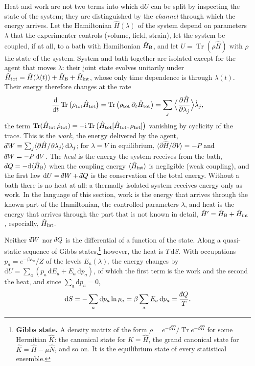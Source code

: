 \documentclass[10pt,a4paper]{article}
\newcommand{\dd}{\mathrm{d}}
\newcommand{\ii}{\mathrm{i}}
\newcommand{\Tr}{\operatorname{Tr}}
\newcommand{\dbar}{\mathchar'26\mkern-11mu d}
\begin{document}
Heat and work are not two terms into which $ \dd U $ can be split by inspecting the state of the system; they are distinguished by the \emph{channel} through which the energy arrives.
Let the Hamiltonian $ \hat H(\lambda) $ of the system depend on parameters $ \lambda $ that the experimenter controls (volume, field, strain), let the system be coupled, if at all, to a bath with Hamiltonian $ \hat H_{\rm B} $, and let $ U = \Tr(\rho\hat H) $ with $ \rho $ the state of the system.
System and bath together are isolated except for the agent that moves $ \lambda $: their joint state evolves unitarily under $ \hat H_{\rm tot} = \hat H(\lambda(t)) + \hat H_{\rm B} + \hat H_{\rm int} $, whose only time dependence is through $ \lambda(t) $.
Their energy therefore changes at the rate
\[
  \frac{\dd}{\dd t}\Tr\big(\rho_{\rm tot}\hat H_{\rm tot}\big)
  = \Tr\big(\rho_{\rm tot}\,\partial_t\hat H_{\rm tot}\big)
  = \sum_j\Big\langle\frac{\partial\hat H}{\partial\lambda_j}\Big\rangle\dot\lambda_j ,
\]
the term $ \Tr(\hat H_{\rm tot}\,\dot\rho_{\rm tot}) = -\ii\Tr\big(\hat H_{\rm tot}[\hat H_{\rm tot}, \rho_{\rm tot}]\big) $ vanishing by cyclicity of the trace.
This is the \emph{work}, the energy delivered by the agent, $ \dbar W = \sum_j\langle\partial\hat H/\partial\lambda_j\rangle\,\dd\lambda_j $; for $ \lambda = V $ in equilibrium, $ \langle\partial\hat H/\partial V\rangle = -P $ and $ \dbar W = -P\,\dd V $.
The \emph{heat} is the energy the system receives from the bath, $ \dbar Q = -\dd\langle\hat H_{\rm B}\rangle $ when the coupling energy $ \langle\hat H_{\rm int}\rangle $ is negligible (weak coupling), and the first law $ \dd U = \dbar W + \dbar Q $ is the conservation of the total energy.
Without a bath there is no heat at all: a thermally isolated system receives energy only as work.
In the language of this section, work is the energy that arrives through the known part of the Hamiltonian, the controlled parameters $ \lambda $, and heat is the energy that arrives through the part that is not known in detail, $ \hat H' = \hat H_{\rm B} + \hat H_{\rm int} $, especially, $ \hat H_{\rm int} $.

Neither $ \dbar W $ nor $ \dbar Q $ is the differential of a function of the state.
Along a quasi-static sequence of Gibbs states,\footnote{\label{fn:gibbsstate}\textbf{Gibbs state.}
A density matrix of the form $ \rho = e^{-\beta\hat K}/\Tr e^{-\beta\hat K} $ for some Hermitian $ \hat K $: the canonical state for $ \hat K = \hat H $, the grand canonical state for $ \hat K = \hat H - \mu\hat N $, and so on.
It is the equilibrium state of every statistical ensemble.} however, the heat is $ T\,\dd S $.
With occupations $ p_a = e^{-\beta E_a}/Z $ of the levels $ E_a(\lambda) $, the energy changes by $ \dd U = \sum_a(p_a\,\dd E_a + E_a\,\dd p_a) $, of which the first term is the work and the second the heat, and since $ \sum_a \dd p_a = 0 $,
\[
  \dd S = -\sum_a \dd p_a\ln p_a = \beta\sum_aE_a\,\dd p_a = \frac{\dbar Q}{T} .
\]
\end{document}
